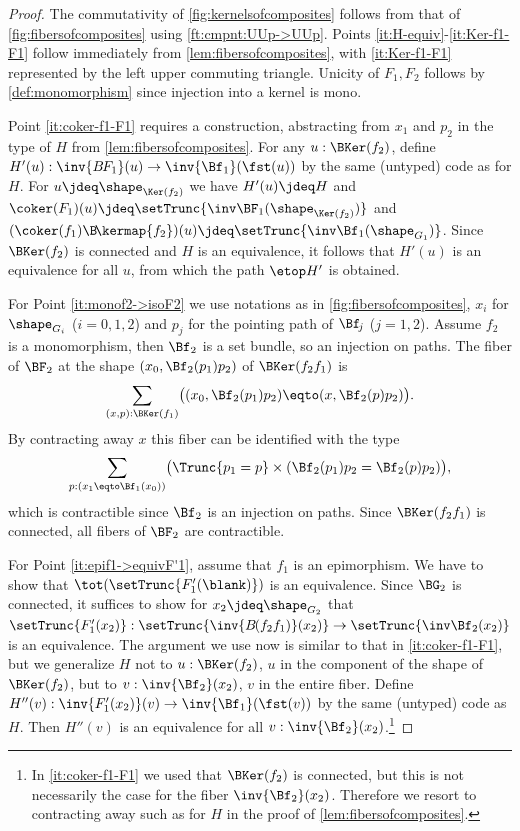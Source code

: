 \begin{proof}
The commutativity of \cref{fig:kernelsofcomposites} follows
from that of \cref{fig:fibersofcomposites} using \cref{ft:cmpnt:UUp->UUp}.
Points \ref{it:H-equiv}-\ref{it:Ker-f1-F1} follow immediately from
\cref{lem:fibersofcomposites}, with \ref{it:Ker-f1-F1} represented 
by the left upper commuting triangle. Unicity of $F_1,F_2$ follows
by \cref{def:monomorphism} since injection into a kernel is mono.

Point \ref{it:coker-f1-F1} requires a construction, abstracting
from $x_1$ and $p_2$ in the type of $H$ from \cref{lem:fibersofcomposites}.
For any $u:\BKer(f_2)$, define
$H'(u): \inv{B\mkern -2mu F_1}(u) \to \inv{\Bf_1}(\fst(u))$
by the same (untyped) code as for $H$. 
For $u\jdeq\sh_{\Ker(f_2)}$ we have $H'(u)\jdeq H$ and
$\coker(F_1)(u)\jdeq \setTrunc{\inv\BF_1(\sh_{\Ker(f_2)})}$ and
$(\coker(f_1)\B\!\kermap{f_2})(u) \jdeq \setTrunc{\inv\Bf_1(\sh_{G_1})}$.
Since $\BKer(f_2)$ is connected and $H$ is an equivalence,
it follows that $H'(u)$ is an equivalence for all $u$,
from which the path $\etop H'$ is obtained.

For Point \ref{it:monof2->isoF2} we use notations as in
\cref{fig:fibersofcomposites}, \ie $x_i$ for $\sh_{G_i}$ ($i=0,1,2$)
and $p_j$ for the pointing path of $\Bf_{\!j}$ ($j=1,2$).
Assume $f_2$ is a monomorphism, then $\Bf_2$ is
a set bundle, so an injection on paths.
The fiber of $\BF_2$ at the shape $(x_0,\Bf_2(p_1)p_2)$
of $\BKer(f_2 f_1)$ is
\[
\sum_{(x,p):\BKer(f_1)} \bigl((x_0,\Bf_2(p_1)p_2)\eqto(x,\Bf_2(p)p_2)\bigr).
\]
By contracting away $x$ this fiber can be identified with the type
\[
\sum_{p:(x_1\eqto \Bf_1(x_0))}\bigl(\Trunc{p_1=p}
\times(\Bf_2(p_1)p_2=\Bf_2(p)p_2)\bigl),
\]
which is contractible since $\Bf_2$ is
an injection on paths. Since $\BKer(f_2 f_1)$ is connected,
all fibers of $\BF_2$ are contractible.

For Point \ref{it:epif1->equivF'1}, assume that $f_1$ is an epimorphism. 
We have to show that $\tot(\setTrunc{F'_1(\blank)})$ is an equivalence. 
Since $\BG_2$ is connected, it suffices to show for $x_2\jdeq\sh_{G_2}$ that 
$\setTrunc{F'_1(x_2)}: 
\setTrunc{\inv{B\mkern -2mu (f_2f_1)}(x_2)} \to \setTrunc{\inv\Bf_2(x_2)}$
is an equivalence. %
The argument we use now is similar to that in \ref{it:coker-f1-F1},
but we generalize $H$ not to $u:\BKer(f_2)$, \ie $u$ in the component
of the shape of $\BKer(f_2)$, but to $v:\inv{\Bf_2}(x_2)$, \ie $v$
in the entire fiber. Define
$H''(v): \inv{F'_1(x_2)}(v) \to \inv{\Bf_1}(\fst(v))$
by the same (untyped) code as $H$. Then $H''(v)$ is an equivalence
for all $v:\inv{\Bf_2}(x_2)$.\footnote{In \ref{it:coker-f1-F1} we
used that $\BKer(f_2)$ is connected, but this is not necessarily
the case for the fiber $\inv{\Bf_2}(x_2)$. Therefore we resort to contracting
away such as for $H$ in the proof of \cref{lem:fibersofcomposites}.}


\end{proof}
